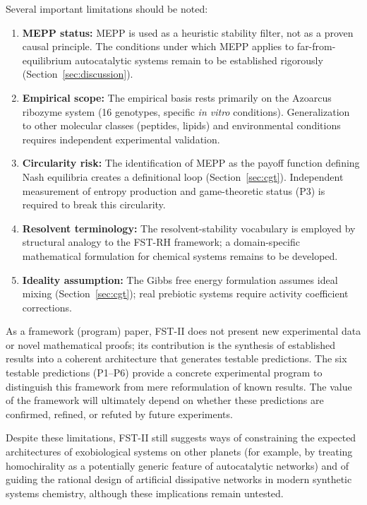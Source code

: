 \documentclass[12pt,a4paper]{article}
\theoremstyle{remark}
\begin{document}
Several important limitations should be noted:
\begin{enumerate}[label=(L\arabic*)]
    \item \textbf{MEPP status:} MEPP is used as a heuristic stability filter, not as a proven causal principle. The conditions under which MEPP applies to far-from-equilibrium autocatalytic systems remain to be established rigorously (Section~\ref{sec:discussion}).
    \item \textbf{Empirical scope:} The empirical basis rests primarily on the Azoarcus ribozyme system (16 genotypes, specific \textit{in vitro} conditions). Generalization to other molecular classes (peptides, lipids) and environmental conditions requires independent experimental validation.
    \item \textbf{Circularity risk:} The identification of MEPP as the payoff function defining Nash equilibria creates a definitional loop (Section~\ref{sec:cgt}). Independent measurement of entropy production and game-theoretic status (P3) is required to break this circularity.
    \item \textbf{Resolvent terminology:} The resolvent-stability vocabulary is employed by structural analogy to the FST-RH framework; a domain-specific mathematical formulation for chemical systems remains to be developed.
    \item \textbf{Ideality assumption:} The Gibbs free energy formulation assumes ideal mixing (Section~\ref{sec:cgt}); real prebiotic systems require activity coefficient corrections.
\end{enumerate}
As a framework (program) paper, FST-II does not present new experimental data or novel mathematical proofs; its contribution is the synthesis of established results into a coherent architecture that generates testable predictions. The six testable predictions (P1--P6) provide a concrete experimental program to distinguish this framework from mere reformulation of known results. The value of the framework will ultimately depend on whether these predictions are confirmed, refined, or refuted by future experiments.

Despite these limitations, FST-II still suggests ways of constraining the expected architectures of exobiological systems on other planets (for example, by treating homochirality as a potentially generic feature of autocatalytic networks) and of guiding the rational design of artificial dissipative networks in modern synthetic systems chemistry, although these implications remain untested.
\end{document}
